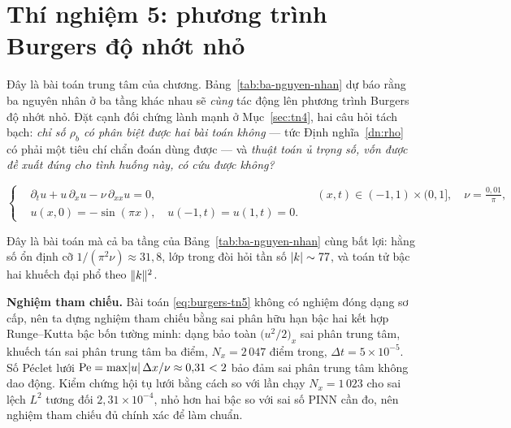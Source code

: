 \section{Thí nghiệm 5: phương trình Burgers độ nhớt nhỏ}
\label{sec:tn5}

\begin{thinghiem}
\label{tn:burgers}
Đây là bài toán trung tâm của chương. Bảng~\ref{tab:ba-nguyen-nhan} dự báo rằng
ba nguyên nhân ở ba tầng khác nhau sẽ \emph{cùng} tác động lên phương trình
Burgers độ nhớt nhỏ. Đặt cạnh đối chứng lành mạnh ở Mục~\ref{sec:tn4}, hai câu
hỏi tách bạch: \emph{chỉ số $\rho_b$ có phân biệt được hai bài toán không} --- tức
Định nghĩa~\ref{dn:rho} có phải một tiêu chí chẩn đoán dùng được --- và
\emph{thuật toán ủ trọng số, vốn được đề xuất đúng cho tình huống này, có cứu
được không?}
\end{thinghiem}

\begin{equation}
\left\{
\begin{aligned}
&\partial_t u + u\,\partial_x u - \nu\,\partial_{xx} u = 0,
  && (x,t) \in (-1,1)\times(0,1], \quad \nu = \tfrac{0{,}01}{\pi},\\
&u(x,0) = -\sin(\pi x), \quad u(-1,t) = u(1,t) = 0.
\end{aligned}
\right.
\label{eq:burgers-tn5}
\end{equation}
 
Đây là bài toán mà cả ba tầng của Bảng~\ref{tab:ba-nguyen-nhan} cùng bất lợi: hằng
số ổn định cỡ $1/(\pi^2\nu) \approx 31{,}8$, lớp trong đòi hỏi tần số
$\lvert k\rvert\sim 77$, và toán tử bậc hai khuếch đại phổ theo $\lVert k\rVert^2$.
 
\textbf{Nghiệm tham chiếu.} Bài toán \eqref{eq:burgers-tn5} không có nghiệm đóng
dạng sơ cấp, nên ta dựng nghiệm tham chiếu bằng sai phân hữu hạn bậc hai kết hợp
Runge--Kutta bậc bốn tường minh: dạng bảo toàn $\big(u^2/2\big)_x$ sai phân trung
tâm, khuếch tán sai phân trung tâm ba điểm, $N_x = 2\,047$ điểm trong,
$\Delta t = 5\times10^{-5}$. Số Péclet lưới
$\mathrm{Pe} = \max\lvert u\rvert\,\Delta x/\nu \approx 0{,}31 < 2$ bảo đảm sai phân
trung tâm không dao động. Kiểm chứng hội tụ lưới bằng cách so với lần chạy
$N_x = 1\,023$ cho sai lệch $L^2$ tương đối $2{,}31\times10^{-4}$, nhỏ hơn hai bậc
so với sai số PINN cần đo, nên nghiệm tham chiếu đủ chính xác để làm chuẩn.
 
